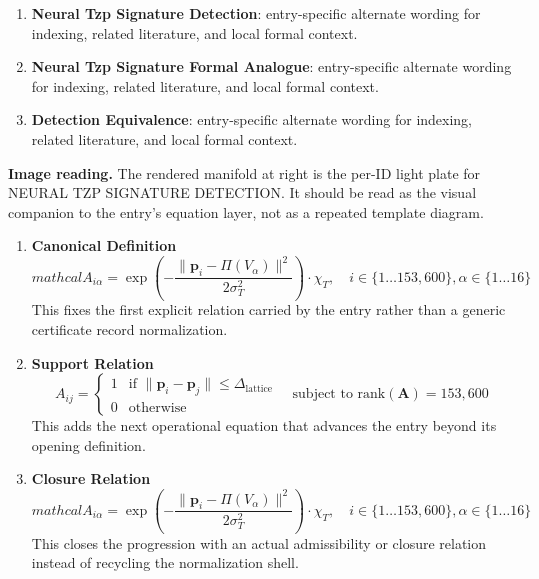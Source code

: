 \begin{enumerate}[leftmargin=1.6em,itemsep=6pt,topsep=4pt]
\item \textbf{Neural Tzp Signature Detection}: entry-specific alternate wording for indexing, related literature, and local formal context.
\item \textbf{Neural Tzp Signature Formal Analogue}: entry-specific alternate wording for indexing, related literature, and local formal context.
\item \textbf{Detection Equivalence}: entry-specific alternate wording for indexing, related literature, and local formal context.
\end{enumerate}

\begin{samepage}
\noindent\begin{minipage}[t]{0.45\linewidth}
\vspace{0pt}
\raggedright
\scriptsize\textbf{Image reading.} The rendered manifold at right is the per-ID light plate for NEURAL TZP SIGNATURE DETECTION. It should be read as the visual companion to the entry's equation layer, not as a repeated template diagram.\par
\end{minipage}\hfill
\begin{minipage}[t]{0.53\linewidth}
\vspace*{-0.10in}
\raggedright
{}
\end{minipage}
\end{samepage}

\clearpage


\begin{enumerate}[leftmargin=1.6em,itemsep=9pt,topsep=6pt]
\item \textbf{Canonical Definition}
\[
mathcal{A}_{i \alpha} = \exp\left( -\frac{\|\mathbf{p}_i - \Pi(V_\alpha)\|^2}{2\sigma_T^2} \right) \cdot \chi_T, \quad i \in \{1 \dots 153,600\}, \alpha \in \{1 \dots 16\}
\]
This fixes the first explicit relation carried by the entry rather than a generic certificate record normalization.

\item \textbf{Support Relation}
\[
A_{ij} = \begin{cases} 1 & \text{if } \|\mathbf{p}_i - \mathbf{p}_j\| \leq \Delta_{\text{lattice}} \\ 0 & \text{otherwise} \end{cases} \quad \text{subject to } \text{rank}(\mathbf{A}) = 153,600
\]
This adds the next operational equation that advances the entry beyond its opening definition.

\item \textbf{Closure Relation}
\[
mathcal{A}_{i \alpha} = \exp\left( -\frac{\|\mathbf{p}_i - \Pi(V_\alpha)\|^2}{2\sigma_T^2} \right) \cdot \chi_T, \quad i \in \{1 \dots 153,600\}, \alpha \in \{1 \dots 16\}
\]
This closes the progression with an actual admissibility or closure relation instead of recycling the normalization shell.
\end{enumerate}

